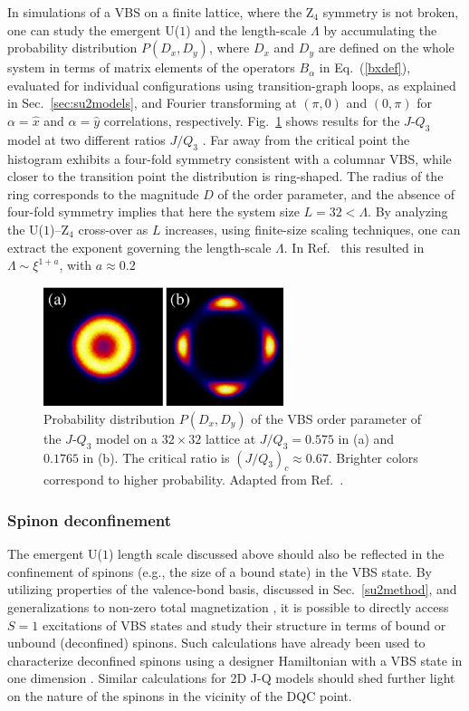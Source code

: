 \documentclass[10pt,pre,aps,twocolumn,showpacs,superscriptaddress,floatfix]{revtex4-1}
\begin{document}
In simulations of a VBS on a finite lattice, where the Z$_4$ symmetry is not broken, one can study the emergent U($1$) and the length-scale $\Lambda$ by 
accumulating the probability distribution $P(D_x,D_y)$, where $D_x$ and $D_y$ are defined on the whole system in terms of matrix elements of the operators 
$B_\alpha$ in Eq.~(\ref{bxdef}), evaluated for individual configurations using transition-graph loops, as explained in Sec.~\ref{sec:su2models}, and Fourier 
transforming at $(\pi,0)$ and $(0,\pi)$ for $\alpha=\hat x$ and $\alpha=\hat y$ correlations, respectively. Fig.~\ref{jq3histo} shows results for the $J$-$Q_3$ 
model at two different ratios $J/Q_3$ \cite{lou2009:sun}. Far away from the critical point the histogram exhibits a four-fold symmetry consistent with a columnar 
VBS, while closer to the transition point the distribution is ring-shaped. The radius of the ring corresponds to the magnitude $D$ of the order parameter, and the 
absence of four-fold symmetry implies that here the system size $L=32 < \Lambda$. By analyzing the U($1$)--Z$_4$ cross-over as $L$ increases, using finite-size 
scaling techniques, one can extract the exponent governing the length-scale $\Lambda$. In Ref.~\cite{lou2009:sun} this resulted in  $\Lambda \sim \xi^{1+a}$, with 
$a \approx 0.2$ 


\begin{figure}
\includegraphics[width=7cm, clip]{fig05.eps}
\caption{Probability distribution $P(D_x,D_y)$ of the VBS order parameter of the $J$-$Q_3$ model on a $32\times 32$
lattice at $J/Q_3 = 0.575$ in (a) and $0.1765$ in (b). The critical ratio is $(J/Q_3)_c \approx 0.67$. Brighter colors
correspond to higher probability. Adapted from Ref.~\cite{lou2009:sun}.}  
\label{jq3histo}
\end{figure}

\subsubsection{Spinon deconfinement}

The emergent U($1$) length scale discussed above should also be reflected in the confinement of spinons (e.g., the size of a bound state) in the VBS state. By utilizing 
properties of the valence-bond basis, discussed in Sec.~\ref{su2method}, and generalizations to non-zero total magnetization \cite{Banerjee10b,Wang10}, it is 
possible to directly access $S=1$ excitations of VBS states and study their structure in terms of bound or unbound (deconfined) spinons. Such calculations have 
already been used to characterize deconfined spinons using a designer Hamiltonian with a VBS state in one dimension \cite{Tang11a}. 
Similar calculations for 2D J-Q models should shed further light on the nature of the spinons in the vicinity of the DQC point.
\end{document}
